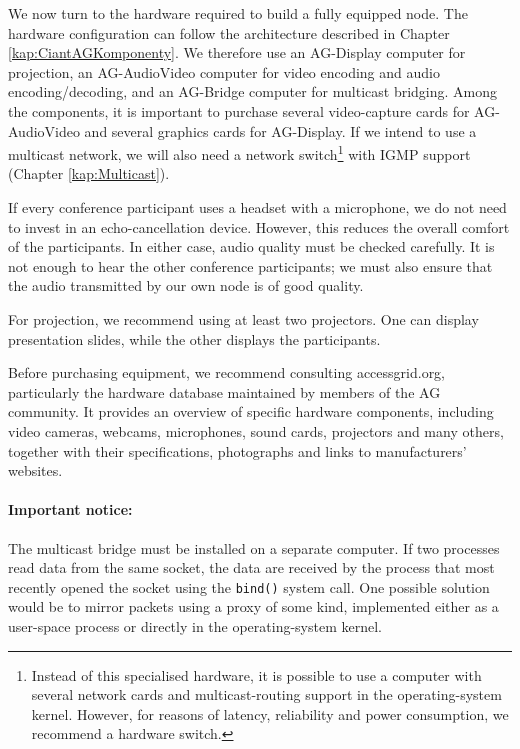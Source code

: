 We now turn to the hardware required to build a fully equipped node. The hardware configuration can follow the architecture described in Chapter \ref{kap:CiantAGKomponenty}. We therefore use an AG-Display computer for projection, an AG-AudioVideo computer for video encoding and audio encoding/decoding, and an AG-Bridge computer for multicast bridging. Among the components, it is important to purchase several video-capture cards for AG-AudioVideo and several graphics cards for AG-Display. If we intend to use a multicast network, we will also need a network switch\footnote{Instead of this specialised hardware, it is possible to use a computer with several network cards and multicast-routing support in the operating-system kernel. However, for reasons of latency, reliability and power consumption, we recommend a hardware switch.} with IGMP support (Chapter \ref{kap:Multicast}).

If every conference participant uses a headset with a microphone, we do not need to invest in an echo-cancellation device. However, this reduces the overall comfort of the participants. In either case, audio quality must be checked carefully. It is not enough to hear the other conference participants; we must also ensure that the audio transmitted by our own node is of good quality.

For projection, we recommend using at least two projectors. One can display presentation slides, while the other displays the participants.

Before purchasing equipment, we recommend consulting accessgrid.org, particularly the hardware database \cite{AG-HardwareDatabase} maintained by members of the AG community. It provides an overview of specific hardware components, including video cameras, webcams, microphones, sound cards, projectors and many others, together with their specifications, photographs and links to manufacturers' websites.

\paragraph*{Important notice:}
The multicast bridge must be installed on a separate computer. If two processes read data from the same socket, the data are received by the process that most recently opened the socket using the \verb|bind()| system call. One possible solution would be to mirror packets using a proxy of some kind, implemented either as a user-space process or directly in the operating-system kernel.


